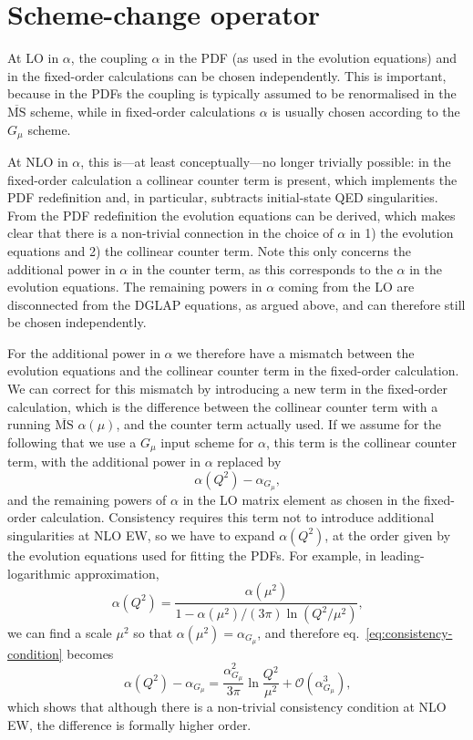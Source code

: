 \section{Scheme-change operator}
\label{sec:scheme-change-operator}

At LO in $\alpha$, the coupling $\alpha$ in the PDF (as used in the evolution equations) and in the fixed-order calculations can be chosen independently.
This is important, because in the PDFs the coupling is typically assumed to be renormalised in the $\overline{\mathrm{MS}}$ scheme, while in fixed-order calculations $\alpha$ is usually chosen according to the $G_\mu$ scheme.

At NLO in $\alpha$, this is---at least conceptually---no longer trivially possible: in the fixed-order calculation a collinear counter term is present, which implements the PDF redefinition and, in particular, subtracts initial-state QED singularities.
From the PDF redefinition the evolution equations can be derived, which makes clear that there is a non-trivial connection in the choice of $\alpha$ in 1) the evolution equations and 2) the collinear counter term.
Note this only concerns the additional power in $\alpha$ in the counter term, as this corresponds to the $\alpha$ in the evolution equations.
The remaining powers in $\alpha$ coming from the LO are disconnected from the DGLAP equations, as argued above, and can therefore still be chosen independently.

For the additional power in $\alpha$ we therefore have a mismatch between the evolution equations and the collinear counter term in the fixed-order calculation.
We can correct for this mismatch by introducing a new term in the fixed-order calculation, which is the difference between the collinear counter term with a running $\overline{\mathrm{MS}}$ $\alpha (\mu)$, and the counter term actually used.
If we assume for the following that we use a $G_\mu$ input scheme for $\alpha$, this term is the collinear counter term, with the additional power in $\alpha$ replaced by
\begin{equation}
\alpha (Q^2) - \alpha_{G_\mu} \text{,} \label{eq:consistency-condition}
\end{equation}
and the remaining powers of $\alpha$ in the LO matrix element as chosen in the fixed-order calculation.
Consistency requires this term not to introduce additional singularities at NLO EW, so we have to expand $\alpha (Q^2)$, at the order given by the evolution equations used for fitting the PDFs.
For example, in leading-logarithmic approximation,
\begin{equation}
\alpha (Q^2) = \frac{\alpha (\mu^2)}{1 - \alpha (\mu^2)/(3\pi) \ln (Q^2/\mu^2)} \text{,}
\end{equation}
we can find a scale $\mu^2$ so that $\alpha (\mu^2) = \alpha_{G_\mu}$, and therefore eq.~\eqref{eq:consistency-condition} becomes
\begin{equation}
\alpha (Q^2) - \alpha_{G_\mu} = \frac{\alpha_{G_\mu}^2}{3 \pi} \ln \frac{Q^2}{\mu^2} + \mathcal{O} (\alpha_{G_\mu}^3) \text{,}
\end{equation}
which shows that although there is a non-trivial consistency condition at NLO EW, the difference is formally higher order.
